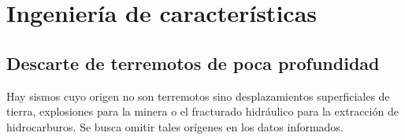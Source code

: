 \documentclass[a4paper]{report}
\begin{document}
\section{Ingeniería de características}\label{sec:ingeniería}







\subsection{Descarte de terremotos de poca profundidad}

Hay sismos cuyo origen no son terremotos sino desplazamientos superficiales de tierra, explosiones para la minera o el fracturado hidráulico para la extracción de hidrocarburos.
Se busca omitir tales orígenes en los datos informados.
\end{document}
